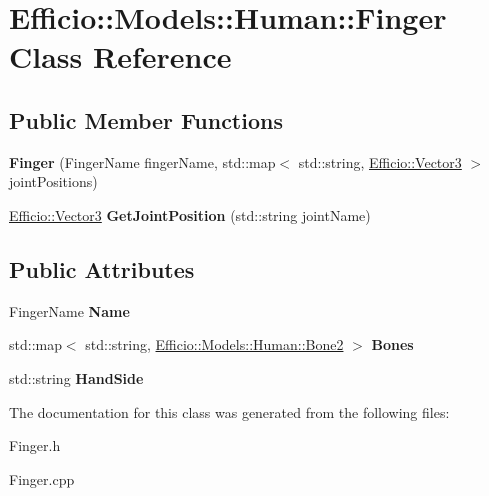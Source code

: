 \hypertarget{class_efficio_1_1_models_1_1_human_1_1_finger}{}\section{Efficio\+:\+:Models\+:\+:Human\+:\+:Finger Class Reference}
\label{class_efficio_1_1_models_1_1_human_1_1_finger}
\subsection*{Public Member Functions}
\begin{DoxyCompactItemize}
\item 
{\bfseries Finger} (Finger\+Name finger\+Name, std\+::map$<$ std\+::string, \hyperlink{class_efficio_1_1_vector3}{Efficio\+::\+Vector3} $>$ joint\+Positions)\hypertarget{class_efficio_1_1_models_1_1_human_1_1_finger_adba563997e627ad79efc039f3189907f}{}\label{class_efficio_1_1_models_1_1_human_1_1_finger_adba563997e627ad79efc039f3189907f}

\item 
\hyperlink{class_efficio_1_1_vector3}{Efficio\+::\+Vector3} {\bfseries Get\+Joint\+Position} (std\+::string joint\+Name)\hypertarget{class_efficio_1_1_models_1_1_human_1_1_finger_acf814b30ef13a7495003aa073d1ea66a}{}\label{class_efficio_1_1_models_1_1_human_1_1_finger_acf814b30ef13a7495003aa073d1ea66a}

\end{DoxyCompactItemize}
\subsection*{Public Attributes}
\begin{DoxyCompactItemize}
\item 
Finger\+Name {\bfseries Name}\hypertarget{class_efficio_1_1_models_1_1_human_1_1_finger_ae73134fdf9c0ba485fce08abdf2e5e59}{}\label{class_efficio_1_1_models_1_1_human_1_1_finger_ae73134fdf9c0ba485fce08abdf2e5e59}

\item 
std\+::map$<$ std\+::string, \hyperlink{class_efficio_1_1_models_1_1_human_1_1_bone2}{Efficio\+::\+Models\+::\+Human\+::\+Bone2} $>$ {\bfseries Bones}\hypertarget{class_efficio_1_1_models_1_1_human_1_1_finger_a6ad1c6157494bc550ab02dd31dabc79d}{}\label{class_efficio_1_1_models_1_1_human_1_1_finger_a6ad1c6157494bc550ab02dd31dabc79d}

\item 
std\+::string {\bfseries Hand\+Side}\hypertarget{class_efficio_1_1_models_1_1_human_1_1_finger_a7dbe93f9094453f1f7bf8b17bd51f5e2}{}\label{class_efficio_1_1_models_1_1_human_1_1_finger_a7dbe93f9094453f1f7bf8b17bd51f5e2}

\end{DoxyCompactItemize}


The documentation for this class was generated from the following files\+:\begin{DoxyCompactItemize}
\item 
Finger.\+h\item 
Finger.\+cpp\end{DoxyCompactItemize}

